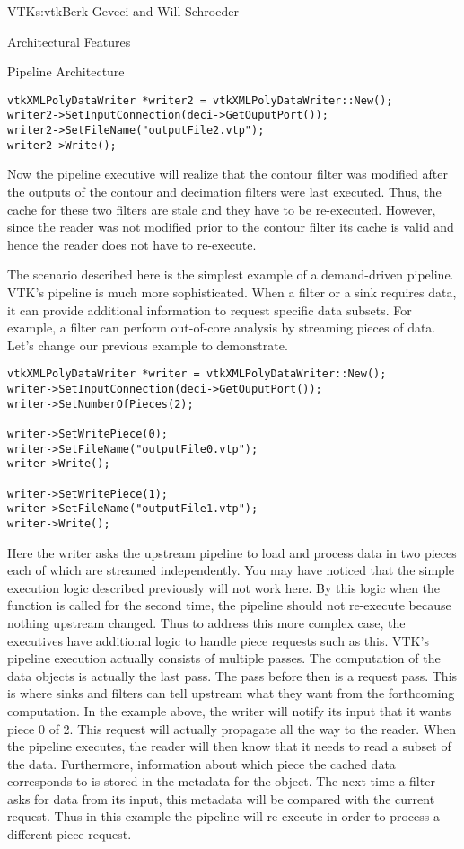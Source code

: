 \begin{aosachapter}{VTK}{s:vtk}{Berk Geveci and Will Schroeder}
\begin{aosasect1}{Architectural Features}
\begin{aosasect2}{Pipeline Architecture}
\begin{verbatim}
vtkXMLPolyDataWriter *writer2 = vtkXMLPolyDataWriter::New();
writer2->SetInputConnection(deci->GetOuputPort());
writer2->SetFileName("outputFile2.vtp");
writer2->Write();
\end{verbatim}

Now the pipeline executive will realize that the contour filter was
modified after the outputs of the contour and decimation filters were
last executed. Thus, the cache for these two filters are stale and
they have to be re-executed. However, since the reader was not
modified prior to the contour filter its cache is valid and hence the
reader does not have to re-execute.

The scenario described here is the simplest example of a demand-driven
pipeline. VTK's pipeline is much more sophisticated. When a filter or
a sink requires data, it can provide additional information to request
specific data subsets. For example, a filter can perform out-of-core
analysis by streaming pieces of data. Let's change our previous
example to demonstrate.

\begin{verbatim}
vtkXMLPolyDataWriter *writer = vtkXMLPolyDataWriter::New();
writer->SetInputConnection(deci->GetOuputPort());
writer->SetNumberOfPieces(2);

writer->SetWritePiece(0);
writer->SetFileName("outputFile0.vtp");
writer->Write();

writer->SetWritePiece(1);
writer->SetFileName("outputFile1.vtp");
writer->Write();
\end{verbatim}

Here the writer asks the upstream pipeline to load and process data in
two pieces each of which are streamed independently. You may have
noticed that the simple execution logic described previously will not
work here. By this logic when the  function is called for
the second time, the pipeline should not re-execute because nothing
upstream changed. Thus to address this more complex case, the
executives have additional logic to handle piece requests such as
this. VTK's pipeline execution actually consists of multiple
passes. The computation of the data objects is actually the last
pass. The pass before then is a request pass. This is where sinks and
filters can tell upstream what they want from the forthcoming
computation. In the example above, the writer will notify its input
that it wants piece 0 of 2. This request will actually propagate all
the way to the reader. When the pipeline executes, the reader will
then know that it needs to read a subset of the data. Furthermore,
information about which piece the cached data corresponds to is stored
in the metadata for the object. The next time a filter asks for data
from its input, this metadata will be compared with the current
request. Thus in this example the pipeline will re-execute in order to
process a different piece request.


\end{aosasect2}
\end{aosasect1}
\end{aosachapter}
